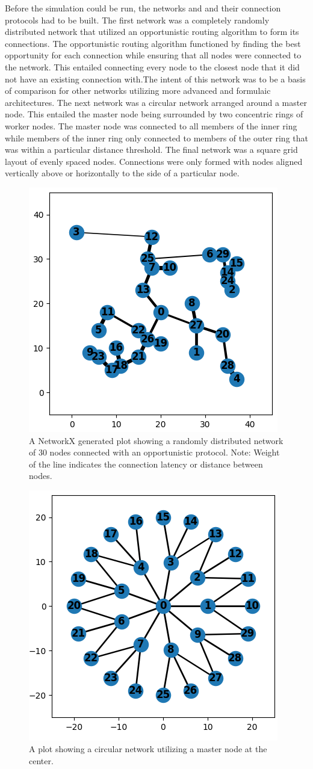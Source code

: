 \documentclass[10pt]{article}
\begin{document}
Before the simulation could be run, the networks and and their connection protocols had to be built. The first network was a completely randomly distributed network that utilized an opportunistic routing algorithm to form its connections. The opportunistic routing algorithm functioned by finding the best opportunity for each connection while ensuring that all nodes were connected to the network. This entailed connecting every node to the closest node that it did not have an existing connection with.The intent of this network was to be a basis of comparison for other networks utilizing more advanced and formulaic architectures. The next network was a circular network arranged around a master node. This entailed the master node being surrounded by two concentric rings of worker nodes. The master node was connected to all members of the inner ring while members of the inner ring only connected to members of the outer ring that was within a particular distance threshold. The final network was a square grid layout of evenly spaced nodes. Connections were only formed with nodes aligned vertically above or horizontally to the side of a particular node. \par

\begin{figure}
\begin{center}
\includegraphics[width=0.33\columnwidth]{figures/RandomLayout.png}
\end{center}
\caption{A NetworkX generated plot showing a randomly distributed network of 30 nodes connected with an opportunistic protocol. Note: Weight of the line indicates the connection latency or distance between nodes.}
\end{figure}

\begin{figure}
\begin{center}
\includegraphics[width=0.33\columnwidth]{figures/MasterLayout.png}
\end{center}
\caption{A plot showing a circular network utilizing a master node at the center.}
\end{figure}
\end{document}
